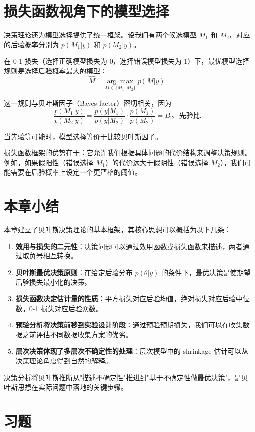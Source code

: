 \section{损失函数视角下的模型选择}

决策理论还为模型选择提供了统一框架。设我们有两个候选模型 $M_1$ 和 $M_2$，对应的后验概率分别为 $p(M_1 | y)$ 和 $p(M_2 | y)$。

在 0-1 损失（选择正确模型损失为 0，选择错误模型损失为 1）下，最优模型选择规则是选择后验概率最大的模型：
\[
\hat{M} = \underset{M \in \{M_1, M_2\}}{\arg\max} \; p(M | y).
\]

这一规则与贝叶斯因子（Bayes factor）密切相关，因为
\[
\frac{p(M_1 | y)}{p(M_2 | y)} = \frac{p(y | M_1)}{p(y | M_2)} \cdot \frac{p(M_1)}{p(M_2)} = B_{12} \cdot \text{先验比}.
\]

当先验等可能时，模型选择等价于比较贝叶斯因子。

损失函数框架的优势在于：它允许我们根据具体问题的代价结构来调整决策规则。例如，如果假阳性（错误选择 $M_1$）的代价远大于假阴性（错误选择 $M_2$），我们可能需要在后验概率上设定一个更严格的阈值。

\section{本章小结}

本章建立了贝叶斯决策理论的基本框架，其核心思想可以概括为以下几条：

\begin{enumerate}
  \item \textbf{效用与损失的二元性}：决策问题可以通过效用函数或损失函数来描述，两者通过取负号相互转换。
  \item \textbf{贝叶斯最优决策原则}：在给定后验分布 $p(\theta | y)$ 的条件下，最优决策是使期望后验损失最小化的决策。
  \item \textbf{损失函数决定估计量的性质}：平方损失对应后验均值，绝对损失对应后验中位数，0-1 损失对应后验众数。
  \item \textbf{预验分析将决策前移到实验设计阶段}：通过预验预期损失，我们可以在收集数据之前评估不同数据收集方案的优劣。
  \item \textbf{层次决策体现了多层次不确定性的处理}：层次模型中的 shrinkage 估计可以从决策理论角度得到自然的解释。
\end{enumerate}

决策分析将贝叶斯推断从"描述不确定性"推进到"基于不确定性做最优决策"，是贝叶斯思想在实际问题中落地的关键步骤。

\section{习题}\label{sec:ch9-exercises}


